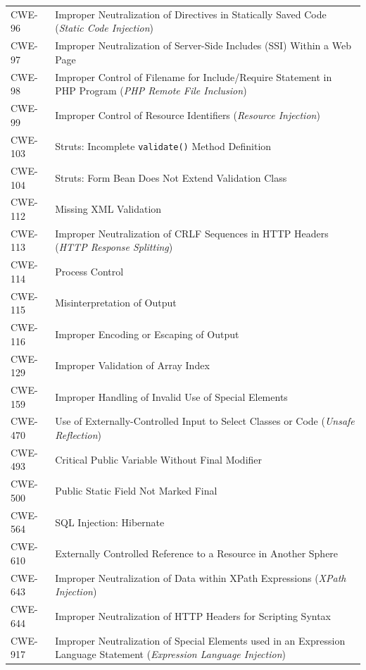 \documentclass[11pt]{article}
\begin{document}
\begin{longtable}{@{}p{2.4cm}p{12.0cm}@{}}
CWE-96  & Improper Neutralization of Directives in Statically Saved Code (\textit{Static Code Injection}) \\
CWE-97  & Improper Neutralization of Server-Side Includes (SSI) Within a Web Page \\
CWE-98  & Improper Control of Filename for Include/Require Statement in PHP Program (\textit{PHP Remote File Inclusion}) \\
CWE-99  & Improper Control of Resource Identifiers (\textit{Resource Injection}) \\
CWE-103 & Struts: Incomplete \texttt{validate()} Method Definition \\
CWE-104 & Struts: Form Bean Does Not Extend Validation Class \\
CWE-112 & Missing XML Validation \\
CWE-113 & Improper Neutralization of CRLF Sequences in HTTP Headers (\textit{HTTP Response Splitting}) \\
CWE-114 & Process Control \\
CWE-115 & Misinterpretation of Output \\
CWE-116 & Improper Encoding or Escaping of Output \\
CWE-129 & Improper Validation of Array Index \\
CWE-159 & Improper Handling of Invalid Use of Special Elements \\
CWE-470 & Use of Externally-Controlled Input to Select Classes or Code (\textit{Unsafe Reflection}) \\
CWE-493 & Critical Public Variable Without Final Modifier \\
CWE-500 & Public Static Field Not Marked Final \\
CWE-564 & SQL Injection: Hibernate \\
CWE-610 & Externally Controlled Reference to a Resource in Another Sphere \\
CWE-643 & Improper Neutralization of Data within XPath Expressions (\textit{XPath Injection}) \\
CWE-644 & Improper Neutralization of HTTP Headers for Scripting Syntax \\
CWE-917 & Improper Neutralization of Special Elements used in an Expression Language Statement (\textit{Expression Language Injection}) \\

\end{longtable}
\end{document}
